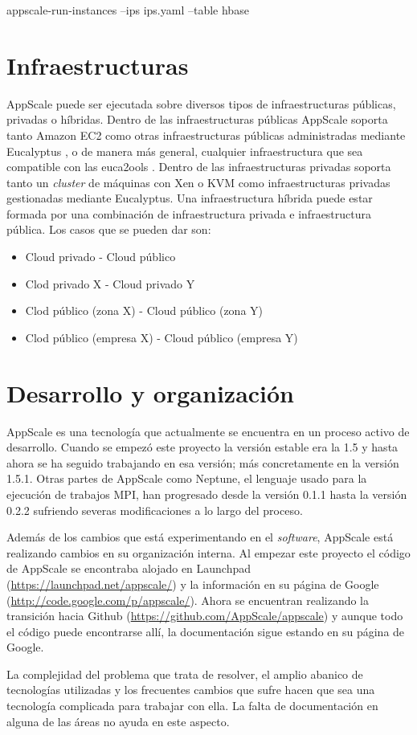 \begin{bashcode}
appscale-run-instances --ips ips.yaml --table hbase
\end{bashcode}


\section{Infraestructuras}

AppScale puede ser ejecutada sobre diversos tipos de infraestructuras públicas, privadas o híbridas. Dentro de las infraestructuras públicas AppScale soporta tanto Amazon EC2 \cite{amazon-ec2} como otras infraestructuras públicas administradas mediante Eucalyptus \cite{eucalyptus}, o de manera más general, cualquier infraestructura que sea compatible con las euca2ools \cite{eucalyptus-euca2ools}. Dentro de las infraestructuras privadas soporta tanto un \emph{cluster} de máquinas con Xen o KVM como infraestructuras privadas gestionadas mediante Eucalyptus. Una infraestructura híbrida puede estar formada por una combinación de infraestructura privada e infraestructura pública. Los casos que se pueden dar son:

\begin{itemize}
\item Cloud privado - Cloud público
\item Clod privado X - Cloud privado Y
\item Clod público (zona X) - Cloud público (zona Y)
\item Clod público (empresa X) - Cloud público (empresa Y)
\end{itemize}


\section{Desarrollo y organización}

AppScale es una tecnología que actualmente se encuentra en un proceso activo de desarrollo. Cuando se empezó este proyecto la versión estable era la 1.5 y hasta ahora se ha seguido trabajando en esa versión; más concretamente en la versión 1.5.1. Otras partes de AppScale como Neptune, el lenguaje usado para la ejecución de trabajos MPI, han progresado desde la versión 0.1.1 hasta la versión 0.2.2 sufriendo severas modificaciones a lo largo del proceso. 

Además de los cambios que está experimentando en el \emph{software}, AppScale está realizando cambios en su organización interna. Al empezar este proyecto el código de AppScale se encontraba alojado en Launchpad (\url{https://launchpad.net/appscale/}) y la información en su página de Google (\url{http://code.google.com/p/appscale/}). Ahora se encuentran realizando la transición hacia Github (\url{https://github.com/AppScale/appscale}) y aunque todo el código puede encontrarse allí, la documentación sigue estando en su página de Google.

La complejidad del problema que trata de resolver, el amplio abanico de tecnologías utilizadas y los frecuentes cambios que sufre hacen que sea una tecnología complicada para trabajar con ella. La falta de documentación en alguna de las áreas no ayuda en este aspecto.
